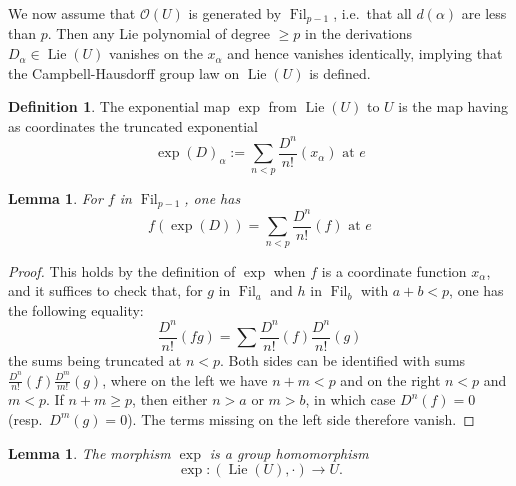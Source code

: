\documentclass[11pt,a4paper]{article}
\theoremstyle{plain}
\newtheorem{lemma}[theorem]{Lemma}
\theoremstyle{definition}
\newtheorem{definition}[theorem]{Definition}
\DeclareMathOperator{\Lie}{Lie}
\DeclareMathOperator{\Fil}{Fil}
\begin{document}
We now assume that $\mathcal{O}(U)$ is generated by $\Fil_{p-1}$, i.e.~that all $d(\alpha)$ are less than $p$. Then any Lie polynomial of degree $\geq p$ in the derivations $D_\alpha \in \Lie(U)$ vanishes on the $x_\alpha$ and hence vanishes identically, implying that the Campbell-Hausdorff group law on $\Lie(U)$ is defined.

\begin{definition} \label{def:6.3}
The exponential map $\exp$ from $\Lie(U)$ to $U$ is the map having as coordinates the truncated exponential
\begin{equation} \label{eq:6.3.1}
\exp(D)_\alpha := \sum_{n < p} \frac{D^n}{n!}(x_\alpha) \text{ at } e
\end{equation}
\end{definition}

\begin{lemma} \label{lem:6.4}
For $f$ in $\Fil_{p-1}$, one has
\begin{equation} \label{eq:6.4.1}
f(\exp(D)) = \sum_{n < p} \frac{D^n}{n!}(f) \text{ at } e
\end{equation}
\end{lemma}

\begin{proof}
This holds by the definition of $\exp$ when $f$ is a coordinate function $x_\alpha$, and it suffices to check that, for $g$ in $\Fil_a$ and $h$ in $\Fil_b$ with $a + b < p$, one has the following equality:
\begin{equation} \label{eq:6.4.2}
\frac{D^n}{n!}(fg) = \sum \frac{D^n}{n!}(f) \frac{D^n}{n!}(g)
\end{equation}
the sums being truncated at $n < p$. Both sides can be identified with sums $\frac{D^n}{n!}(f) \frac{D^m}{m!}(g)$, where on the left we have $n + m < p$ and on the right $n < p$ and $m < p$. If $n + m \geq p$, then either $n > a$ or $m > b$, in which case $D^n(f) = 0$ (resp.~$D^m(g) = 0$). The terms missing on the left side therefore vanish. \qedhere
\end{proof}

\begin{lemma} \label{lem:6.5}
The morphism $\exp$ is a group homomorphism
\begin{equation} \label{eq:6.5.1}
\exp : (\Lie(U), \cdot) \to U.
\end{equation}
\end{lemma}
\end{document}
